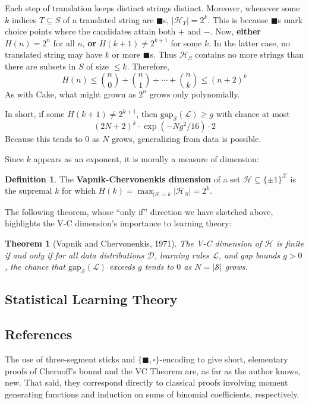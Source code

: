 \documentclass[twocolumn]{article}
\newcommand{\Dd}{\mathcal{D}}
\newcommand{\Hh}{\mathcal{H}}
\newcommand{\Ll}{\mathcal{L}}
\newcommand{\Ss}{\mathcal{S}}
\newcommand{\Xx}{\mathcal{X}}
\newcommand{\Egap}{\text{gap}_{\Ss}}
\newtheorem{thm}{Theorem}
\theoremstyle{definition}
\newtheorem{dfn}{Definition}
\begin{document}
    Each step of translation keeps distinct strings distinct.
    Moreover, whenever some $k$ indices $T\subseteq S$ of a translated string
    are $\blacksquare$s, $|\Hh_T| = 2^k$.  This is because $\blacksquare$s mark
    choice points where the candidates attain both $+$ and $-$.
    Now, \textbf{either} $H(n)=2^n$ for all $n$, \textbf{or} $H(k+1) \neq 2^{k+1}$
    for some $k$.  In the latter case, no translated string may have $k$ or
    more $\blacksquare$s.  Thus $\Hh_S$ contains no more strings than
    there are subsets in $S$ of size $\leq k$.  Therefore,
    $$
        H(n)
        \leq 
        {n\choose 0} + {n\choose 1} + \cdots + {n\choose k}
        \leq 
        (n+2)^{k}
    $$
    As with Cake, what might grown as $2^n$ grows only
    polynomially.

    In short, if some $H(k+1) \neq 2^{k+1}$, then $\Egap(\Ll) \geq g$
    with chance at most
    $$
       (2N+2)^k \cdot \exp(-Ng^2/16) \cdot 2
    $$
    Because this tends to $0$ as $N$ grows, generalizing from data is possible.

    Since $k$ appears as an exponent, it is morally a measure of dimension:
    \begin{dfn}
        The \textbf{Vapnik-Chervonenkis dimension} of a set
        $\Hh \subseteq \{\pm 1\}^\Xx$ is the supremal $k$ for which
        $H(k) = \max_{|S|=k} |\Hh_S| = 2^k$.  
    \end{dfn}
    The following theorem, whose ``only if'' direction we have sketched above,
    highlights the V-C dimension's importance to learning theory:
    \begin{thm}[Vapnik and Chervonenkis, 1971]
        The V-C dimension of $\Hh$ is finite if and only if for all data
        distributions $\Dd$, learning rules $\Ll$, and gap bounds $g>0$, the
        chance that $\Egap(\Ll)$ exceeds $g$ tends to $0$ as $N=|\Ss|$ grows.  
    \end{thm}

    \subsection*{Statistical Learning Theory}

    \subsection*{References}
        The use of three-segment sticks and $\{\blacksquare,
        \square\}$-encoding to give short, elementary proofs of Chernoff's
        bound and the VC Theorem are, as far as the author knows, new.  That
        said, they correspond directly to classical proofs involving moment
        generating functions and induction on sums of binomial coefficients,
        respectively. 
\end{document}
